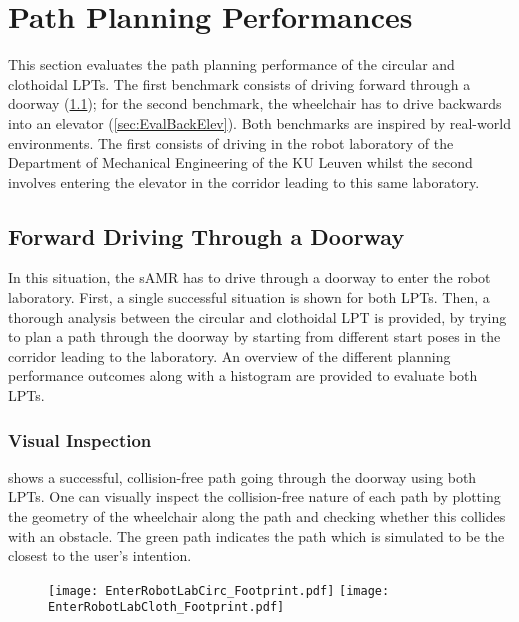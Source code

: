 \newpage

\section{Path Planning Performances} \label{sec:EvalPPP}
This section evaluates the path planning performance of the circular and clothoidal LPTs. The first benchmark consists of driving forward through a doorway (\cref{sec:EvalForwardDoor}); for the second benchmark, the wheelchair has to drive backwards into an elevator (\cref{sec:EvalBackElev}). Both benchmarks are inspired by real-world environments. The first consists of driving in the robot laboratory of the Department of Mechanical Engineering of the KU Leuven whilst the second involves entering the elevator in the corridor leading to this same laboratory.

\subsection{Forward Driving Through a Doorway} \label{sec:EvalForwardDoor}
In this situation, the sAMR has to drive through a doorway to enter the robot laboratory. First, a single successful situation is shown for both LPTs. Then, a thorough analysis between the circular and clothoidal LPT is provided, by trying to plan a path through the doorway by starting from different start poses in the corridor leading to the laboratory. An overview of the different planning performance outcomes along with a histogram are provided to evaluate both LPTs.

\subsubsection{Visual Inspection}
 shows a successful, collision-free path going through the doorway using both LPTs. One can visually inspect the collision-free nature of each path by plotting the geometry of the wheelchair along the path and checking whether this collides with an obstacle. The green path indicates the path which is simulated to be the closest to the user's intention.

\begin{figure}[!htbp]
	\centering
    \texttt{[image: EnterRobotLabCirc\_Footprint.pdf]}
    \hfill
    \texttt{[image: EnterRobotLabCloth\_Footprint.pdf]}
\end{figure}

